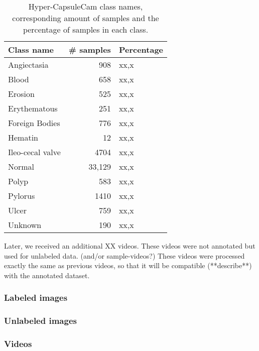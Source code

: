 \documentclass[thesis.tex]{subfiles}
\begin{document}
\begin{table} %
  \centering
  \begin{tabular}{|l|r|l|}
  	\hline
  	Class name & \# samples & Percentage \\
    \hline
    Angiectasia		& 908	& xx,x \\ 
    Blood			& 658	& xx,x \\ 
    Erosion			& 525	& xx,x \\ 
    Erythematous	& 251	& xx,x \\
    Foreign Bodies	& 776	& xx,x \\
    Hematin			& 12	& xx,x \\
    Ileo-cecal valve& 4704	& xx,x \\
    Normal			& 33,129& xx,x \\
    Polyp			& 583	& xx,x \\
    Pylorus			& 1410	& xx,x \\
    Ulcer			& 759	& xx,x \\
    Unknown			& 190	& xx,x \\
    \hline
  \end{tabular}
  \caption[Hyper-CapsuleCam class names and number of samples.]{Hyper-CapsuleCam class names, corresponding amount of samples and the percentage of samples in each class.}
  \label{table:kvasir_pillcam_samples}
\end{table}

Later, we received an additional XX videos. These videos were not annotated but used for unlabeled data. (and/or sample-videos?)
These videos were processed exactly the same as previous videos, so that it will be compatible (**describe**) with the annotated dataset.


\subsubsection{Labeled images}
\subsubsection{Unlabeled images}
\subsubsection{Videos}

\end{document}
